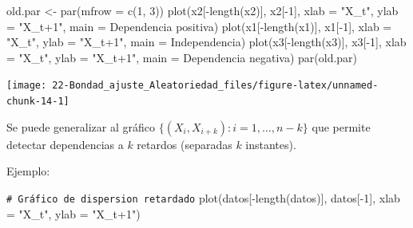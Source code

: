 \documentclass[
  10pt,
]{book}
\newenvironment{Shaded}{\begin{snugshade}}{\end{snugshade}}
\newcommand{\AttributeTok}[1]{\textcolor[rgb]{0.77,0.63,0.00}{#1}}
\newcommand{\CommentTok}[1]{\textcolor[rgb]{0.56,0.35,0.01}{\textit{#1}}}
\newcommand{\DecValTok}[1]{\textcolor[rgb]{0.00,0.00,0.81}{#1}}
\newcommand{\FunctionTok}[1]{\textcolor[rgb]{0.00,0.00,0.00}{#1}}
\newcommand{\NormalTok}[1]{#1}
\newcommand{\OtherTok}[1]{\textcolor[rgb]{0.56,0.35,0.01}{#1}}
\newcommand{\SpecialCharTok}[1]{\textcolor[rgb]{0.00,0.00,0.00}{#1}}
\newcommand{\StringTok}[1]{\textcolor[rgb]{0.31,0.60,0.02}{#1}}
\theoremstyle{break}
\theoremstyle{nonumberplain}
\renewcommand{\CommentTok}[1]{\textcolor[rgb]{0.41,0.41,0.41}{\texttt{#1}}}
\begin{document}
\begin{Shaded}
\begin{Highlighting}[]
\NormalTok{old.par }\OtherTok{\textless{}{-}} \FunctionTok{par}\NormalTok{(}\AttributeTok{mfrow =} \FunctionTok{c}\NormalTok{(}\DecValTok{1}\NormalTok{, }\DecValTok{3}\NormalTok{))}
\FunctionTok{plot}\NormalTok{(x2[}\SpecialCharTok{{-}}\FunctionTok{length}\NormalTok{(x2)], x2[}\SpecialCharTok{{-}}\DecValTok{1}\NormalTok{], }\AttributeTok{xlab =} \StringTok{"X\_t"}\NormalTok{, }\AttributeTok{ylab =} \StringTok{"X\_t+1"}\NormalTok{, }
     \AttributeTok{main =} \StringTok{\textquotesingle{}Dependencia positiva\textquotesingle{}}\NormalTok{)}
\FunctionTok{plot}\NormalTok{(x1[}\SpecialCharTok{{-}}\FunctionTok{length}\NormalTok{(x1)], x1[}\SpecialCharTok{{-}}\DecValTok{1}\NormalTok{], }\AttributeTok{xlab =} \StringTok{"X\_t"}\NormalTok{, }\AttributeTok{ylab =} \StringTok{"X\_t+1"}\NormalTok{, }
     \AttributeTok{main =} \StringTok{\textquotesingle{}Independencia\textquotesingle{}}\NormalTok{)}
\FunctionTok{plot}\NormalTok{(x3[}\SpecialCharTok{{-}}\FunctionTok{length}\NormalTok{(x3)], x3[}\SpecialCharTok{{-}}\DecValTok{1}\NormalTok{], }\AttributeTok{xlab =} \StringTok{"X\_t"}\NormalTok{, }\AttributeTok{ylab =} \StringTok{"X\_t+1"}\NormalTok{, }
     \AttributeTok{main =} \StringTok{\textquotesingle{}Dependencia negativa\textquotesingle{}}\NormalTok{)}
\FunctionTok{par}\NormalTok{(old.par)}
\end{Highlighting}
\end{Shaded}

\begin{center}\texttt{[image: 22-Bondad\_ajuste\_Aleatoriedad\_files/figure-latex/unnamed-chunk-14-1]} \end{center}

Se puede generalizar al gráfico \(\{(X_{i},X_{i+k}) : i = 1, \ldots, n-k \}\) que permite detectar dependencias a \(k\) retardos (separadas \(k\) instantes).

Ejemplo:

\begin{Shaded}
\begin{Highlighting}[]
\CommentTok{\# Gráfico de dispersion retardado}
\FunctionTok{plot}\NormalTok{(datos[}\SpecialCharTok{{-}}\FunctionTok{length}\NormalTok{(datos)], datos[}\SpecialCharTok{{-}}\DecValTok{1}\NormalTok{], }\AttributeTok{xlab =} \StringTok{"X\_t"}\NormalTok{, }\AttributeTok{ylab =} \StringTok{"X\_t+1"}\NormalTok{)}
\end{Highlighting}
\end{Shaded}
\end{document}

